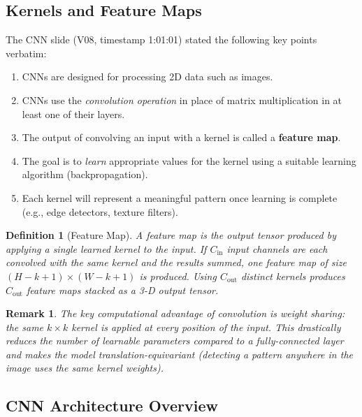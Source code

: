 \documentclass[12pt,a4paper]{article}
\newtheorem{definition}{Definition}[section]
\newtheorem{remark}{Remark}[section]
\begin{document}
\subsection{Kernels and Feature Maps}
\label{sec:cnn_intro:kernels}

The CNN slide (V08, timestamp 1:01:01) stated the following key points
verbatim:

\begin{enumerate}
  \item CNNs are designed for processing 2D data such as images.
  \item CNNs use the \emph{convolution operation} in place of matrix
        multiplication in at least one of their layers.
  \item The output of convolving an input with a kernel is called a
        \textbf{feature map}.
  \item The goal is to \emph{learn} appropriate values for the kernel using a
        suitable learning algorithm (backpropagation).
  \item Each kernel will represent a meaningful pattern once learning is
        complete (e.g., edge detectors, texture filters).
\end{enumerate}

\begin{definition}[Feature Map]
  \label{def:feature_map}
  A \emph{feature map} is the output tensor produced by applying a single
  learned kernel to the input.  If $C_{\text{in}}$ input channels are each
  convolved with the same kernel and the results summed, one feature map
  of size $(H - k + 1) \times (W - k + 1)$ is produced.  Using $C_{\text{out}}$
  distinct kernels produces $C_{\text{out}}$ feature maps stacked as a
  3-D output tensor.
\end{definition}

\begin{remark}
  \label{rem:weight_sharing}
  The key computational advantage of convolution is \emph{weight sharing}:
  the same $k \times k$ kernel is applied at \emph{every} position of the
  input.  This drastically reduces the number of learnable parameters
  compared to a fully-connected layer and makes the model
  \emph{translation-equivariant} (detecting a pattern anywhere in the image
  uses the same kernel weights).
\end{remark}

\subsection{CNN Architecture Overview}
\label{sec:cnn_intro:arch}
\end{document}
